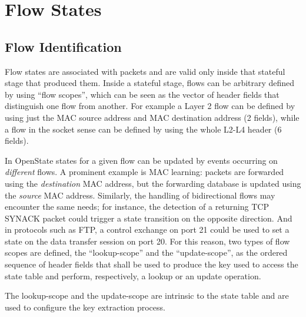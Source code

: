 
\chapter{Flow States}
\label{chap:flow_states}

\section{Flow Identification}

Flow states are associated with packets and are valid only inside that stateful stage that produced them. Inside a stateful stage, flows can be arbitrary defined by using ``flow scopes'', which can be seen as the vector of header fields that distinguish one flow from another. For example a Layer 2 flow can be defined by using just the MAC source address and MAC destination address (2 fields), while a flow in the socket sense can be defined by using the whole L2-L4 header (6 fields).

In OpenState states for a given flow can be updated by events occurring on {\em different} flows. A prominent example is MAC learning: packets are forwarded using the {\em destination} MAC address, but the forwarding database is updated using the {\em source} MAC address. Similarly, the handling of bidirectional flows may encounter the same needs; for instance, the detection of a returning TCP SYNACK packet could trigger a state transition on the opposite direction. And in protocols such as FTP, a control exchange on port 21 could be used to set a state on the data transfer session on port 20. For this reason, two types of flow scopes are defined, the ``lookup-scope'' and the ``update-scope'', as the ordered sequence of header fields that shall be used to produce the key used to access the state table and perform, respectively, a lookup or an update operation.


The lookup-scope and the update-scope are intrinsic to the state table and are used to configure the key extraction process.


